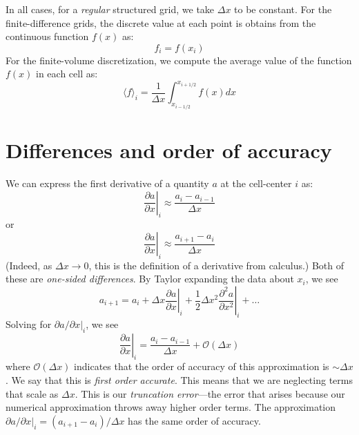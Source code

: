 In all cases, for a {\em regular} structured grid, we take $\Delta x$
to be constant.  For the finite-difference grids, the discrete value at
each point is obtains from the continuous function $f(x)$ as:
\begin{equation}
f_i = f(x_i)
\end{equation}
For the finite-volume discretization, we compute the average value of 
the function $f(x)$ in each cell as:
\begin{equation}
\langle f\rangle_i = \frac{1}{\Delta x} \int_{x_{i-1/2}}^{x_{i+1/2}} f(x) dx
\end{equation}

\section{Differences and order of accuracy}

We can express the first derivative of a quantity $a$ at the cell-center $i$
as:
\begin{equation}
\left . \frac{\partial a}{\partial x} \right |_i \approx \frac{a_i - a_{i-1}}{\Delta x}
\end{equation}
or
\begin{equation}
\left . \frac{\partial a}{\partial x} \right |_i \approx \frac{a_{i+1} - a_i}{\Delta x}
\end{equation}
%
(Indeed, as $\Delta x \rightarrow 0$, this is the definition of a derivative from calculus.)
Both of these are {\em one-sided differences}.  By Taylor expanding the data
about $x_i$, we see
\begin{equation}
a_{i+1} = a_i + \Delta x \left . \frac{\partial a}{\partial x} \right |_i + \frac{1}{2} \Delta x^2 \left . \frac{\partial^2 a}{\partial x^2} \right |_i + \ldots
\end{equation}
Solving for ${\partial a}/{\partial x} |_i$, we see
\begin{equation}
\left . \frac{\partial a}{\partial x} \right |_i = \frac{a_i - a_{i-1}}{\Delta x} + \mathcal{O}(\Delta x)
\end{equation}
where $\mathcal{O}(\Delta x)$ indicates that the order of accuracy of
this approximation is $\sim \Delta x$.  We say that this is {\em first
  order accurate}.  This means that we are neglecting terms that scale
as $\Delta x$.  This is our {\em truncation error}---the error that
arises because our numerical approximation throws away higher order
terms.  The approximation ${\partial a}/{\partial x} |_i = ({a_{i+1} -
  a_i})/{\Delta x}$ has the same order of accuracy.

